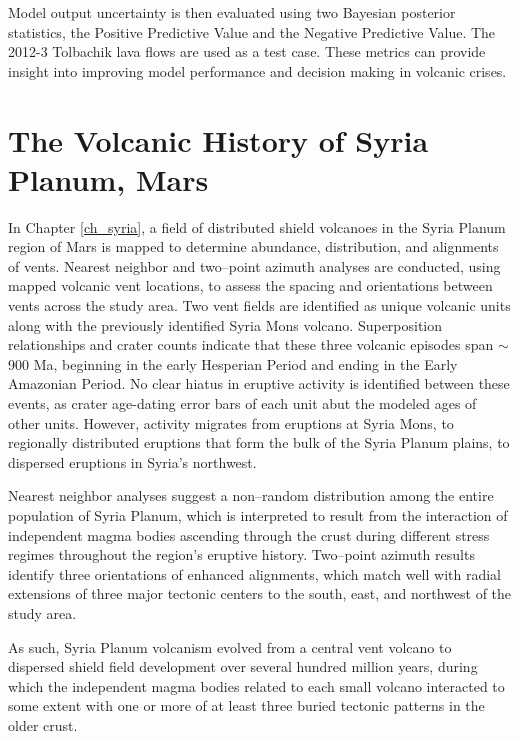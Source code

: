 Model output uncertainty is then evaluated using two Bayesian posterior statistics, the Positive Predictive Value and the Negative Predictive Value. The 2012-3 Tolbachik lava flows are used as a test case. These metrics can provide insight into improving model performance and decision making in volcanic crises.

\section{The Volcanic History of Syria Planum, Mars}
In Chapter \ref{ch_syria}, a field of distributed shield volcanoes in the Syria Planum region of Mars is mapped to determine abundance, distribution, and alignments of vents. Nearest neighbor and two--point azimuth analyses are conducted, using mapped volcanic vent locations, to assess the spacing and orientations between vents across the study area. Two vent fields are identified as unique volcanic units along with the previously identified Syria Mons volcano. Superposition relationships and crater counts indicate that these three volcanic episodes span $\sim$900 Ma, beginning in the early Hesperian Period and ending in the Early Amazonian Period. No clear hiatus in eruptive activity is identified between these events, as crater age-dating error bars of each unit abut the modeled ages of other units. However, activity migrates from eruptions at Syria Mons, to regionally distributed eruptions that form the bulk of the Syria Planum plains, to dispersed eruptions in Syria's northwest. 

Nearest neighbor analyses suggest a non--random distribution among the entire population of Syria Planum, which is interpreted to result from the interaction of independent magma bodies ascending through the crust during different stress regimes throughout the region's eruptive history. Two--point azimuth results identify three orientations of enhanced alignments, which match well with radial extensions of three major tectonic centers to the south, east, and northwest of the study area. 

As such, Syria Planum volcanism evolved from a central vent volcano to dispersed shield field development over several hundred million years, during which the independent magma bodies related to each small volcano interacted to some extent with one or more of at least three buried tectonic patterns in the older crust.


